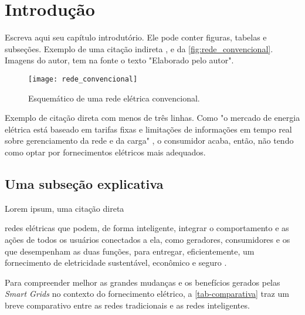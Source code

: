 \chapter[Introdução]{Introdução}
\label{ch:introdução}
Escreva aqui seu capítulo introdutório. Ele pode conter figuras, tabelas e subseções. Exemplo de uma citação indireta \cite{alvaropfn}, e da \autoref{fig:rede_convencional}. Imagens do autor, tem na fonte o texto "Elaborado pelo autor".

\begin{figure}[h!]
	\texttt{[image: rede\_convencional]}
	\centering
	\caption[Esquemático de uma rede elétrica convencional.]{Esquemático de uma rede elétrica convencional.}
	\label{fig:rede_convencional}
\end{figure}
\FloatBarrier

Exemplo de citação direta com menos de três linhas. Como "o mercado de energia elétrica está baseado em tarifas fixas e limitações de informações em tempo real sobre gerenciamento da rede e da carga" \cite[p. 15]{cgee}, o consumidor acaba, então, não tendo como optar por fornecimentos elétricos mais adequados. 


\section{Uma subseção explicativa}

Lorem ipsum, uma citação direta 

\begin{citacao}[brazil]
[...] redes elétricas que podem, de forma inteligente, integrar o comportamento e as ações de todos os usuários conectados a ela, como geradores, consumidores e os que desempenham as duas funções, para entregar, eficientemente, um fornecimento de eletricidade sustentável, econômico e seguro \cite[p. 51, tradução livre]{yu2011new}.
\end{citacao}

Para compreender melhor as grandes mudanças e os benefícios gerados pelas \textit{Smart Grids} no contexto do fornecimento elétrico, a \autoref{tab-comparativa} traz um breve comparativo entre as redes tradicionais e as redes inteligentes.

